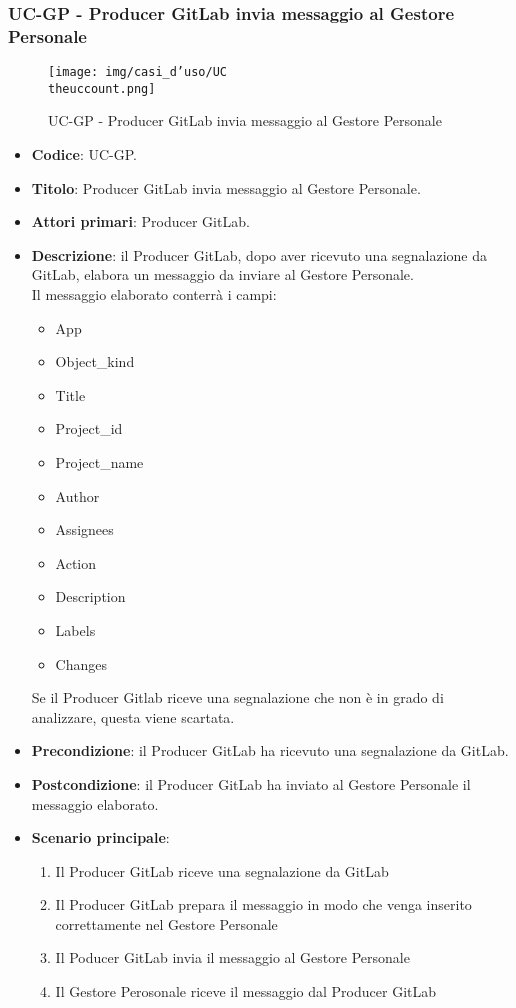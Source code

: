 \subsubsection{UC\theuccount-GP - Producer GitLab invia messaggio al Gestore Personale}
	\begin{figure}[H]
		\centering
		\texttt{[image: img/casi\_d'uso/UC\\theuccount.png]}\\
		\caption{UC\theuccount-GP - Producer GitLab invia messaggio al Gestore Personale}
	\end{figure}
	\begin{itemize}
		\item \textbf{Codice}: UC\theuccount-GP.
		\item \textbf{Titolo}: Producer GitLab invia messaggio al Gestore Personale.
		\item \textbf{Attori primari}: Producer GitLab.
		\item \textbf{Descrizione}: il Producer GitLab, dopo aver ricevuto una segnalazione da GitLab, elabora un messaggio da inviare al Gestore Personale. \\ Il messaggio elaborato conterrà i campi:
		\begin{itemize}
			\item App
			\item Object\_kind
			\item Title
			\item Project\_id
			\item Project\_name
			\item Author
			\item Assignees
			\item Action
			\item Description
			\item Labels
			\item Changes
		\end{itemize}
        Se il Producer Gitlab riceve una segnalazione che non è in grado di analizzare, questa viene scartata.
		\item \textbf{Precondizione}: il Producer GitLab ha ricevuto una segnalazione da GitLab.
		\item \textbf{Postcondizione}: il Producer GitLab ha inviato al Gestore Personale il messaggio  \newline elaborato.
		\item \textbf{Scenario principale}:
		\begin{enumerate}
			\item Il Producer GitLab riceve una segnalazione da GitLab
			\item Il Producer GitLab prepara il messaggio in modo che venga inserito correttamente nel Gestore Personale
			\item Il Poducer GitLab invia il messaggio al Gestore Personale
            \item Il Gestore Perosonale riceve il messaggio dal Producer GitLab
		\end{enumerate}
	\end{itemize}

